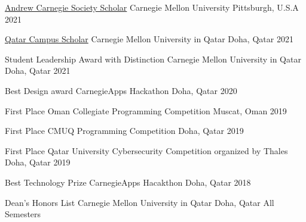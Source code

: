 



\begin{cvhonors}

\cvhonor
    {\href{https://www.cmu.edu/engage/give/donor-recognition/andrew-carnegie-society/acs-scholars.html}{Andrew Carnegie Society Scholar}} %
    {Carnegie Mellon University} %
    {Pittsburgh, U.S.A} %
    {2021} %

\cvhonor
    {\href{https://graduation.qatar.cmu.edu/awards-and-honors/}{Qatar Campus Scholar}} %
    {Carnegie Mellon University in Qatar} %
    {Doha, Qatar} %
    {2021} %

\cvhonor
    {Student Leadership Award with Distinction} %
    {Carnegie Mellon University in Qatar} %
    {Doha, Qatar} %
    {2021} %

\cvhonor
    {Best Design award} %
    {CarnegieApps Hackathon } %
    {Doha, Qatar} %
    {2020} %

\cvhonor
    {First Place} %
    {Oman Collegiate Programming Competition} %
    {Muscat, Oman} %
    {2019} %

\cvhonor
    {First Place} %
    {CMUQ Programming Competition} %
    {Doha, Qatar} %
    {2019} %

  \cvhonor
    {First Place} %
    {Qatar University Cybersecurity Competition organized by Thales } %
    {Doha, Qatar} %
    {2019} %

  \cvhonor
    {Best Technology Prize} %
    {CarnegieApps Hacakthon} %
    {Doha, Qatar} %
    {2018} %

  \cvhonor
    {Dean's Honors List} %
    {Carnegie Mellon University in Qatar} %
    {Doha, Qatar} %
    {All Semesters} %

\end{cvhonors}



